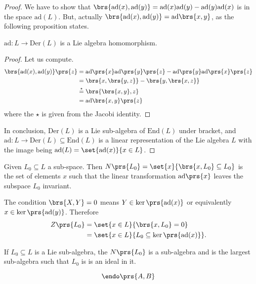 \documentclass[10pt,a4paper,twoside,openany,hidelinks]{book}
\begin{document}
\begin{proof}
We have to show that $\brs{\mathrm{ad}(x),\mathrm{ad}(y)} = \mathrm{ad}(x)\mathrm{ad}(y) - \mathrm{ad}(y)\mathrm{ad}(x)$ is in the space $\mathrm{ad}(L)$. But, actually $\brs{\mathrm{ad}(x), \mathrm{ad}(y)} = \mathrm{ad}\brs{x,y}$, as the following proposition states.
\begin{proposition}
$\mathrm{ad} \colon L \to \mathrm{Der}(L)$
is a Lie algebra homomorphism.
\end{proposition}
\begin{proof}
Let us compute.
\begin{align*}
\brs{\mathrm{ad}(x), \mathrm{ad}(y)}\prs{z} &= \mathrm{ad}\prs{x} \mathrm{ad}\prs{y}\prs{z} - \mathrm{ad}\prs{y}\mathrm{ad}\prs{x}\prs{z} \\
&= \brs{x,\brs{y,z}} - \brs{y,\brs{x,z}} \\
&\stackrel{\star}{=} \brs{\brs{x,y},z} \\
&= \mathrm{ad}\brs{x,y}\prs{z}
\end{align*}
where the $\star$ is given from the Jacobi identity.
\end{proof}
In conclusion, $\mathrm{Der}(L)$ is a Lie sub-algebra of $\mathrm{End}(L)$ under bracket, and $\mathrm{ad} \colon L \to \mathrm{Der}(L) \subseteq \mathrm{End}(L)$ is a linear representation of the Lie algebra $L$ with the image being $\mathrm{ad}(L) = \set{\mathrm{ad}(x)}{x \in L}$.
\end{proof}
\begin{example}
Given $L_0 \subseteq L$ a sub-space. Then
$N\prs{L_0} = \set{x}{\brs{x,L_0} \subseteq L_0}$ is the set of elements $x$ such that the linear transformation $\mathrm{ad}\prs{x}$ leaves the subspace $L_0$ invariant.
\end{example}
\begin{example}
The condition $\brs{X,Y} = 0$ means $Y \in \ker\prs{\mathrm{ad}(x)}$ or equivalently $x \in \ker\prs{\mathrm{ad}(y)}$. Therefore
\begin{align*}
Z\prs{L_0} &= \set{x \in L}{\brs{x,L_0} = 0} \\
&= \set{x \in L}{L_0 \subseteq \ker\prs{\mathrm{ad}(x)}} \text{.}
\end{align*}
\end{example}
\begin{remark}
If $L_0 \subseteq L$ is a Lie sub-algebra, the $N\prs{L_0}$ is a sub-algebra and is the largest sub-algebra such that $L_0$ is is an ideal in it.
\end{remark}

\[\endo\prs{A,B}\]

\backmatter
\end{document}
